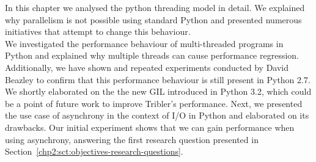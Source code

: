 In this chapter we analysed the python threading model in detail.
We explained why parallelism is not possible using standard Python and presented numerous initiatives that attempt to change this behaviour.\\
We investigated the performance behaviour of multi-threaded programs in Python and explained why multiple threads can cause performance regression.
Additionally, we have shown and repeated experiments conducted by David Beazley to confirm that this performance behaviour is still present in Python 2.7.\\
We shortly elaborated on the the new GIL introduced in Python 3.2, which could be a point of future work to improve Tribler's performance.
Next, we presented the use case of asynchrony in the context of I/O in Python and elaborated on its drawbacks.
Our initial experiment shows that we can gain performance when using asynchrony, answering the first research question presented in Section~\ref{chp2:sct:objectives-research-questions}.